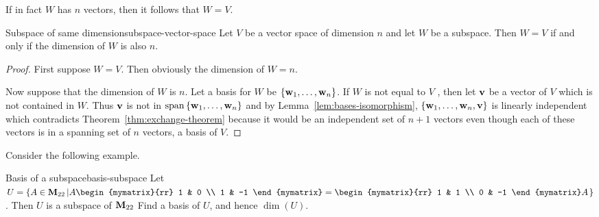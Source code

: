 If in fact $W$ has $n$ vectors, then it follows that $W=V$.

\begin{theorem}{Subspace of same dimension}{subspace-vector-space}
  Let $V$ be a vector space of dimension $n$ and let $W$ be a
  subspace. Then $W=V$ if and only if the dimension of $W$ is also
  $n$.
\end{theorem}

\begin{proof}
  First suppose $W=V$. Then obviously the dimension of $W=n$.

  Now suppose that the dimension of $W$ is $n$. Let a basis for $W$ be
  $ \left\{\mbox{\bf w}_{1},\ldots,\mbox{\bf w}_{n}\right\}$. If $W$ is not equal to
  $V$ , then let $\mbox{\bf v}$ be a vector of $V$ which is not contained
  in $W$. Thus $ \mbox{\bf v}$ is not in
  $\sspan\set{\vect{w}_{1},\ldots,\vect{w} _{n}} $ and by
  Lemma~\ref{lem:bases-isomorphism},
  $\left\{\mbox{\bf w}_{1},\ldots,\mbox{\bf w}_{n},\mbox{\bf v}\right\} $ is linearly
  independent which contradicts Theorem~\ref{thm:exchange-theorem}
  because it would be an independent set of $n+1$ vectors even though
  each of these vectors is in a spanning set of $n$ vectors, a basis
  of $V$.
\end{proof}

Consider the following example.

\begin{example}{Basis of a subspace}{basis-subspace}
  Let $U=\set{A\in\Mat_{22} \left\vert
      A\begin{mymatrix}{rr}
        1 & 0 \\ 1 & -1 \end{mymatrix}
      = \begin{mymatrix}{rr}
        1 & 1 \\ 0 & -1 \end{mymatrix} A \right.}$.
  Then $U$ is a subspace of $\mathbf{M}_{22}$
  Find a basis of $U$, and hence $\dim(U)$.
\end{example}

